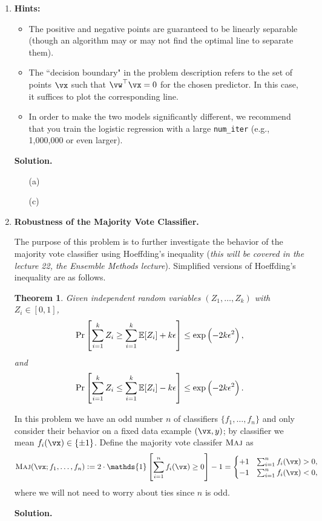 \documentclass{article}
\def\eps{\epsilon}
\def\1{\mathds{1}}
\newtheorem{theorem}{Theorem}
\theoremstyle{definition}
\theoremstyle{remark}
\newenvironment{Q}
{%
\clearpage
\item
}
{%
\phantom{s}%
\bigskip%
\noindent\textbf{Solution.}
}
\begin{document}
\begin{enumerate}[font={\Large\bfseries},left=0pt]
\begin{Q}
\begin{enumerate}
  \textbf{Hints:}
  \begin{itemize}
      \item The positive and negative points are guaranteed to be linearly separable (though an algorithm may or may not find the optimal line to separate them).
      \item The ``decision boundary" in the problem description refers to the set of points $\vx$ such that $\vw^\top \vx = 0$ for the chosen predictor. In this case, it suffices to plot the corresponding line.
      \item In order to make the two models significantly different, we recommend that you train the logistic regression with a large \texttt{num\_iter} (e.g., 1,000,000 or even larger).
  \end{itemize}
  \end{enumerate}
\end{Q}
\begin{enumerate}
  \item[(a)]
  \item[(c)]
\end{enumerate}
 
\begin{Q}
  \textbf{\Large Robustness of the Majority Vote Classifier.}\\
  \def\maj{\textsc{Maj}}

   
   The purpose of this problem is to further investigate the behavior of the majority vote classifier using Hoeffding's inequality (\textit{this will be covered in the lecture 22, the Ensemble Methods lecture}).  Simplified versions of Hoeffding's inequality are as follows.
    \begin{theorem}\label{thm: hoeffding}
      Given independent random variables $(Z_1,\ldots,Z_k)$ with $Z_i \in [0,1]$,
        \begin{equation}\label{eq: hoeffding 1}
          \Pr\sbr{\sum_{i=1}^k Z_i \geq  \sum_{i=1}^k\mathbb{E}[Z_i] + k\eps } \leq \exp\del{-2k\eps^2},
        \end{equation}
        and
        \begin{equation}\label{eq: hoeffding 2}
          \Pr\sbr{\sum_{i=1}^k Z_i \leq  \sum_{i=1}^k\mathbb{E}[Z_i] - k\eps } \leq \exp\del{-2k\eps^2}.
        \end{equation}
    \end{theorem}

    In this problem we have an odd number $n$ of classifiers $\{f_1,\ldots,f_n\}$
    and only consider their behavior
    on a fixed data example $(\vx,y)$; by classifier we mean $f_i(\vx) \in \{\pm 1\}$.
    Define the majority vote classifer $\maj$ as
    \[
      \maj(\vx;f_1,\ldots,f_n)
      := 2\cdot \1\sbr{\sum_{i=1}^n f_i(\vx) \geq 0 } - 1
      = \begin{cases}
          +1 &\sum_{i=1}^n f_i(\vx) > 0, \\
          -1 &\sum_{i=1}^n f_i(\vx) < 0,
        \end{cases}
    \]
    where we will not need to worry about ties since $n$ is odd.


\end{Q}
\end{enumerate}
\end{document}

